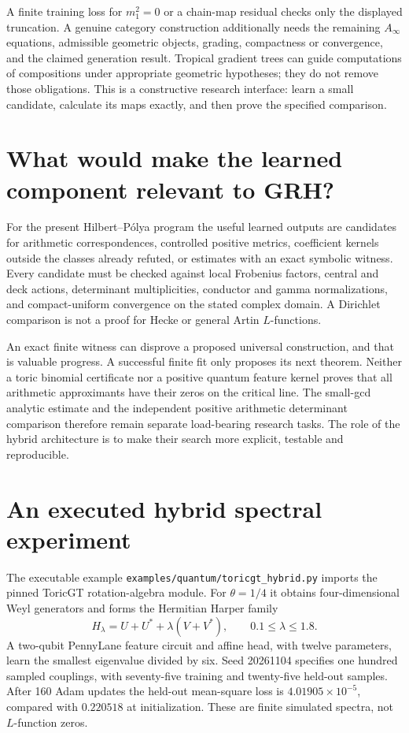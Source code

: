\documentclass[11pt,oneside,openany]{book}
\theoremstyle{definition}\newtheorem{definition}[theorem]{Definition}
\theoremstyle{remark}\newtheorem{remark}[theorem]{Remark}
\begin{document}
A finite training loss for $m_1^2=0$ or a chain-map residual checks only
the displayed truncation. A genuine category construction additionally
needs the remaining $A_\infty$ equations, admissible geometric objects,
grading, compactness or convergence, and the claimed generation result.
Tropical gradient trees can guide computations of compositions under
appropriate geometric hypotheses; they do not remove those obligations.
This is a constructive research interface: learn a small candidate,
calculate its maps exactly, and then prove the specified comparison.

\section{What would make the learned component relevant to GRH?}
For the present Hilbert--P\'olya program the useful learned outputs are
candidates for arithmetic correspondences, controlled positive metrics,
coefficient kernels outside the classes already refuted, or estimates
with an exact symbolic witness. Every candidate must be checked against
local Frobenius factors, central and deck actions, determinant
multiplicities, conductor and gamma normalizations, and compact-uniform
convergence on the stated complex domain. A Dirichlet comparison is not
a proof for Hecke or general Artin $L$-functions.

An exact finite witness can disprove a proposed universal construction,
and that is valuable progress. A successful finite fit only proposes its
next theorem. Neither a toric binomial certificate nor a positive quantum
feature kernel proves that all arithmetic approximants have their zeros
on the critical line. The small-gcd analytic estimate and the independent
positive arithmetic determinant comparison therefore remain separate
load-bearing research tasks. The role of the hybrid architecture is to
make their search more explicit, testable and reproducible.

\section{An executed hybrid spectral experiment}
The executable example \texttt{examples/quantum/toricgt\_hybrid.py} imports the pinned ToricGT rotation-algebra module. For $\theta=1/4$ it obtains four-dimensional Weyl generators and forms the Hermitian Harper family
\[
 H_\lambda=U+U^*+\lambda(V+V^*),\qquad 0.1\le\lambda\le1.8.
\]
A two-qubit PennyLane feature circuit and affine head, with twelve parameters, learn the smallest eigenvalue divided by six. Seed 20261104 specifies one hundred sampled couplings, with seventy-five training and twenty-five held-out samples. After 160 Adam updates the held-out mean-square loss is $4.01905\times10^{-5}$, compared with $0.220518$ at initialization. These are finite simulated spectra, not $L$-function zeros.
\end{document}
